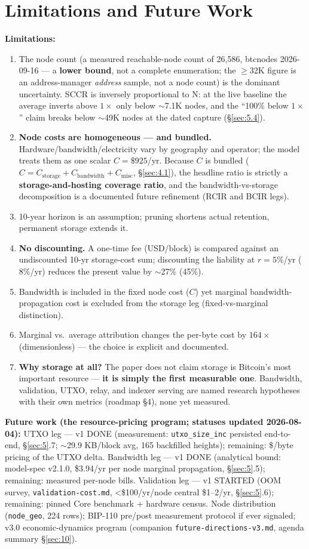 \documentclass[11pt]{article}
\begin{document}
\section{Limitations and Future Work}\label{sec:7}
\textbf{Limitations:}
\begin{enumerate}[nosep]
  \item The node count (a measured reachable-node count of 26{,}586, btcnodes 2026-09-16 --- a \textbf{lower bound}, not a complete enumeration; the $\geq$32K figure is an address-manager \emph{address} sample, not a node count) is the dominant uncertainty. SCCR is inversely proportional to N: at the live baseline the average inverts above $1\times$ only below $\sim$7.1K nodes, and the ``100\% below $1\times$'' claim breaks below $\sim$49K nodes at the dated capture (\S\ref{sec:5.4}).
  \item \textbf{Node costs are homogeneous --- and bundled.} Hardware/bandwidth/electricity vary by geography and operator; the model treats them as one scalar $C = \$925$/yr. Because $C$ is bundled ($C = C_{\mathrm{storage}} + C_{\mathrm{bandwidth}} + C_{\mathrm{misc}}$, \S\ref{sec:4.1}), the headline ratio is strictly a \textbf{storage-and-hosting coverage ratio}, and the bandwidth-vs-storage decomposition is a documented future refinement (RCIR and BCIR legs).
  \item 10-year horizon is an assumption; pruning shortens actual retention, permanent storage extends it.
  \item \textbf{No discounting.} A one-time fee (USD/block) is compared against an undiscounted 10-yr storage-cost sum; discounting the liability at $r=5\%$/yr ($8\%$/yr) reduces the present value by $\sim$27\% (45\%).
  \item Bandwidth is included in the fixed node cost ($C$) yet marginal bandwidth-propagation cost is excluded from the storage leg (fixed-vs-marginal distinction).
  \item Marginal vs.\ average attribution changes the per-byte cost by $164\times$ (dimensionless) --- the choice is explicit and documented.
  \item \textbf{Why storage at all?} The paper does not claim storage is Bitcoin's most important resource --- \textbf{it is simply the first measurable one}. Bandwidth, validation, UTXO, relay, and indexer serving are named research hypotheses with their own metrics (roadmap \S4), none yet measured.
\end{enumerate}
\textbf{Future work (the resource-pricing program; statuses updated 2026-08-04):} UTXO leg --- v1 DONE (measurement: \texttt{utxo\_size\_inc} persisted end-to-end, \S\ref{sec:5}.7; $\sim$29.9 KB/block avg, 165 backfilled heights); remaining: \$/byte pricing of the UTXO delta. Bandwidth leg --- v1 DONE (analytical bound: model-spec v2.1.0, \$3.94/yr per node marginal propagation, \S\ref{sec:5}.5); remaining: measured per-node bills. Validation leg --- v1 STARTED (OOM survey, \texttt{validation-cost.md}, <\$100/yr/node central \$1--2/yr, \S\ref{sec:5}.6); remaining: pinned Core benchmark + hardware census. Node distribution (\texttt{node\_geo}, 224 rows); BIP-110 pre/post measurement protocol if ever signaled; v3.0 economic-dynamics program (companion \texttt{future-directions-v3.md}, agenda summary \S\ref{sec:10}).
\end{document}
